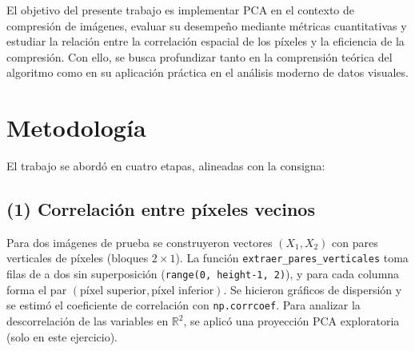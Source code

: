 \documentclass[12pt]{article}
\begin{document}
El objetivo del presente trabajo es implementar PCA en el contexto de compresión de imágenes, evaluar su desempeño mediante métricas cuantitativas y estudiar la relación entre la correlación espacial de los píxeles y la eficiencia de la compresión. Con ello, se busca profundizar tanto en la comprensión teórica del algoritmo como en su aplicación práctica en el análisis moderno de datos visuales.

\section{Metodología}
El trabajo se abordó en cuatro etapas, alineadas con la consigna:

\subsection*{(1) Correlación entre píxeles vecinos}
Para dos imágenes de prueba se construyeron vectores \((X_1, X_2)\) con pares verticales de píxeles (bloques \(2\times 1\)). La función \texttt{extraer\_pares\_verticales} toma filas de a dos sin superposición (\texttt{range(0, height-1, 2)}), y para cada columna forma el par \((\text{píxel superior}, \text{píxel inferior})\). Se hicieron gráficos de dispersión y se estimó el coeficiente de correlación con \texttt{np.corrcoef}. Para analizar la descorrelación de las variables en \(\mathbb{R}^2\), se aplicó una proyección PCA exploratoria (solo en este ejercicio).
\end{document}
